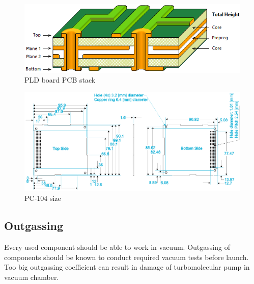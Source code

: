         \begin{figure}[H]
            \centering
            \includegraphics[width=0.5\paperwidth]{img/PLD_PCB_stack.png}
            \caption{PLD board PCB stack}
            \label{PLD_PCB_stack}
        \end{figure}

        \begin{figure}[H]
            \centering
            \includegraphics[width=0.7\paperwidth]{img/PC104_PLD_size.png}
            \caption{PC-104 size}
            \label{PLD_PCB_size}
        \end{figure}



    \subsection{Outgassing}
        Every used component should be able to work in vacuum. Outgassing of components should be known to conduct required vacuum tests before launch. Too big outgassing coefficient can result in damage of turbomolecular pump in vacuum chamber.

